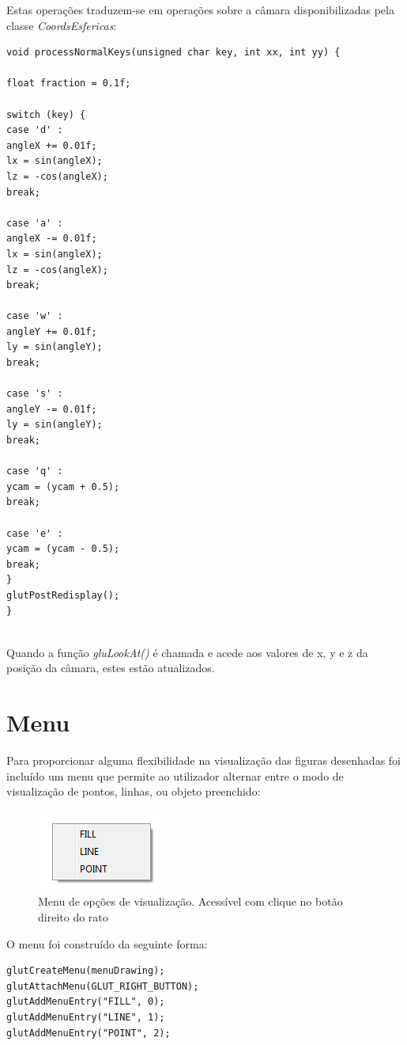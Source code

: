 Estas operações traduzem-se em operações sobre a câmara disponibilizadas pela classe \textit{CoordsEsfericas}:

\begin{Verbatim}
void processNormalKeys(unsigned char key, int xx, int yy) {

float fraction = 0.1f;

switch (key) {
case 'd' :
angleX += 0.01f;
lx = sin(angleX);
lz = -cos(angleX);
break;

case 'a' :
angleX -= 0.01f;
lx = sin(angleX);
lz = -cos(angleX);
break;

case 'w' :
angleY += 0.01f;
ly = sin(angleY);
break;

case 's' :
angleY -= 0.01f;
ly = sin(angleY);
break;

case 'q' :
ycam = (ycam + 0.5);
break;

case 'e' :
ycam = (ycam - 0.5);
break;
}
glutPostRedisplay();
}


\end{Verbatim}

Quando a função \textit{gluLookAt()} é chamada e acede aos valores de x, y e z da posição da câmara, estes estão atualizados.

\section{Menu}

Para proporcionar alguma flexibilidade na visualização das figuras desenhadas foi incluído um menu que permite ao utilizador alternar entre o modo de visualização de pontos, linhas, ou objeto preenchido:

\begin{figure}[<+htpb+>]
	\centering
	\includegraphics[scale=1.0]{imagens/p1_menuOpcoes.png}
	\caption{Menu de opções de visualização. Acessível com clique no botão direito do rato}
	\label{p1:fig:p1_menuOpcoes}
\end{figure}

O menu foi construído da seguinte forma:

\begin{Verbatim}
glutCreateMenu(menuDrawing);
glutAttachMenu(GLUT_RIGHT_BUTTON);
glutAddMenuEntry("FILL", 0);
glutAddMenuEntry("LINE", 1);
glutAddMenuEntry("POINT", 2);
\end{Verbatim}

